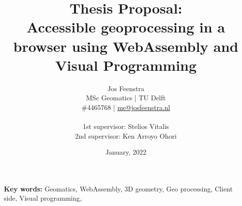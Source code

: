 \documentclass[a4paper,10pt]{scrartcl}
\title{Thesis Proposal: \\
Accessible geoprocessing in a browser using WebAssembly and Visual Programming
}
\author{
  Jos Feenstra\\
  MSc Geomatics | TU Delft\\
  \#4465768 | \url{me@josfeenstra.nl}\\
  \\
  1st supervisor: Stelios Vitalis \\
  2nd supervisor: Ken Arroyo Ohori \\
}
\date{January, 2022}
\begin{document}
  
\clearpage\maketitle
\thispagestyle{empty}
\sffamily

\begin{center}
  \textbf{Key words:} Geomatics, WebAssembly, 3D geometry, Geo processing, Client side, Visual programming, 
\end{center}

\newpage
\printacronyms

\newpage
\tableofcontents

\newpage

\newpage

\newpage

\newpage

\newpage

\newpage


\newpage




\end{document}

